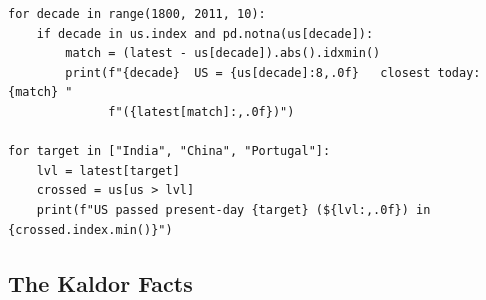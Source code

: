 \documentclass[12pt, letterpaper]{article}
\begin{document}
\begin{tcolorbox}[oddbox,title={Problem 3.1 \quad The Past is a Foreign Country}]
\begin{tcolorbox}[theorybox,title={Code}]
\begin{verbatim}
for decade in range(1800, 2011, 10):
    if decade in us.index and pd.notna(us[decade]):
        match = (latest - us[decade]).abs().idxmin()
        print(f"{decade}  US = {us[decade]:8,.0f}   closest today: {match} "
              f"({latest[match]:,.0f})")

for target in ["India", "China", "Portugal"]:
    lvl = latest[target]
    crossed = us[us > lvl]
    print(f"US passed present-day {target} (${lvl:,.0f}) in {crossed.index.min()}")
\end{verbatim}
\end{tcolorbox}
\end{tcolorbox}

\subsection{The Kaldor Facts}
\end{document}
